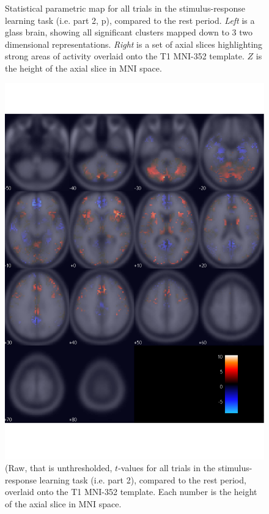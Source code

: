 \documentclass[doc,12pt]{apa}        %
\begin{document}
\begin{figure}[tp]
    \centering
    \caption{Statistical parametric map for all trials in the stimulus-response learning task (i.e. part 2, p\pageref{subsub:whatwhen}), compared to the rest period.  \emph{Left} is a glass brain, showing all significant clusters mapped down to 3 two dimensional representations.  \emph{Right} is a set of axial slices highlighting strong areas of activity overlaid onto the T1 MNI-352 template.  $Z$ is the height of the axial slice in MNI space.}
	\label{fig:gl}
\end{figure}

\begin{figure}[tp]
	\includegraphics{f_map_gl_raw_t}
    \centering
	\caption{(Raw, that is unthresholded, $t$-values for all trials in the stimulus-response learning task (i.e. part 2), compared to the rest period,  overlaid onto the T1 MNI-352 template.   Each number is the height of the axial slice in MNI space.}
	\label{fig:glraw}
\end{figure}
\end{document}

